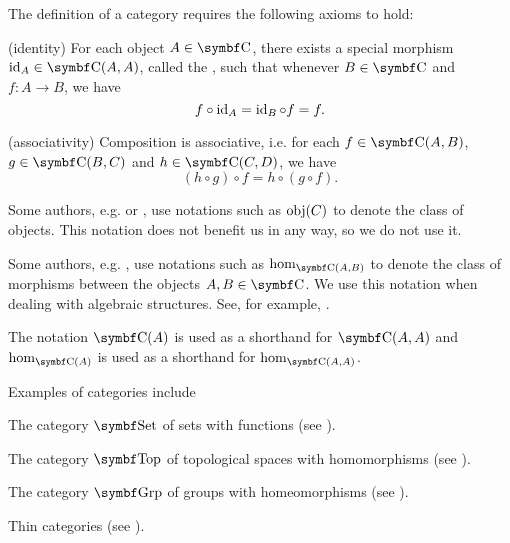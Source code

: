 \begin{definition}
  The definition of a category requires the following axioms to hold:
  \begin{defenum}[resume=def:category]
    (identity) For each object \( A \in \Cat{C} \), there exists a special morphism \( \Id_A \in \Cat{C}(A, A) \), called the , such that whenever \( B \in \Cat{C} \) and \( f: A \to B \), we have
    \begin{equation*}
      f \circ \operatorname{id}_A = \operatorname{id}_B \circ f = f.
    \end{equation*}

    (associativity) Composition is associative, i.e. for each \( f \in \Cat{C}(A, B) \), \( g \in \Cat{C}(B, C) \) and \( h \in \Cat{C}(C, D) \), we have
    \begin{equation*}
      (h \circ g) \circ f = h \circ (g \circ f).
    \end{equation*}
  \end{defenum}
\end{definition}

\begin{remark}\label{remark:category_obj_hom}
  Some authors, e.g. \cite{Leinster2014} or \cite{Aluffi2009}, use notations such as \( \operatorname{obj}(C) \) to denote the class of objects. This notation does not benefit us in any way, so we do not use it.

  Some authors, e.g. \cite{MacLane1994}, use notations such as \( \Op{hom}_{\Cat{C}(A, B)} \) to denote the class of morphisms between the objects \( A, B \in \Cat{C} \). We use this notation when dealing with algebraic structures. See, for example, .

  The notation \( \Cat{C}(A) \) is used as a shorthand for \( \Cat{C}(A, A) \) and \( \hom_{\Cat{C}(A)} \) is used as a shorthand for \( \hom_{\Cat{C}(A, A)} \).
\end{remark}

\begin{example}\label{ex:categories}
  Examples of categories include

  \begin{defenum}
    \item The category \( \Cat{Set} \) of sets with functions (see ).
    \item The category \( \Cat{Top} \) of topological spaces with homomorphisms (see ).
    \item The category \( \Cat{Grp} \) of groups with homeomorphisms (see ).
    \item Thin categories (see ).
  \end{defenum}
\end{example}

